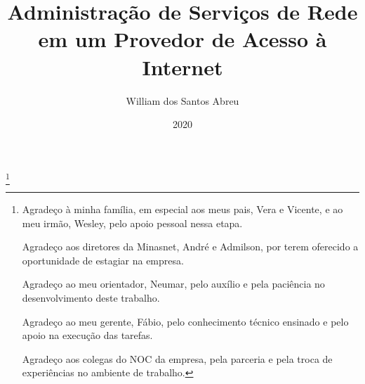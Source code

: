 \documentclass{uflamon}          %
\author{William dos Santos Abreu}
\title{Administração de Serviços de Rede em um Provedor de Acesso à Internet}
\date{2020}
\begin{document}
  \maketitle


  \thanks{
  
    Agradeço à minha família, em especial aos meus pais, Vera e Vicente, e ao meu irmão, Wesley, pelo apoio pessoal nessa etapa.
    
    Agradeço aos diretores da Minasnet, André e Admilson, por terem oferecido a oportunidade de estagiar na empresa.
    
    Agradeço ao meu orientador, Neumar, pelo auxílio e pela paciência no desenvolvimento deste trabalho.
    
    Agradeço ao meu gerente, Fábio, pelo conhecimento técnico ensinado e pelo apoio na execução das tarefas.
    
    Agradeço aos colegas do NOC da empresa, pela parceria e pela troca de experiências no ambiente de trabalho.
  }


\end{document}
